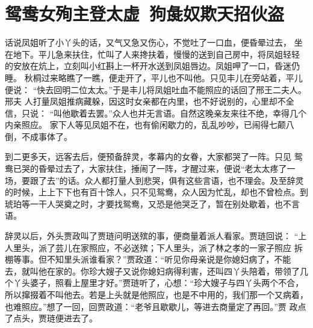 \chapter{鸳鸯女殉主登太虚~狗彘奴欺天招伙盗}

话说凤姐听了小丫头的话，又气又急又伤心，不觉吐了一口血，便昏晕过去，
坐在地下。平儿急来扶住，忙叫了人来搀扶着，慢慢的送到自己房中，将凤姐轻轻
的安放在炕上，立刻叫小红斟上一杯开水送到凤姐唇边。凤姐呷了一口，昏迷仍睡。
秋桐过来略瞧了一瞧，便走开了，平儿也不叫他。只见丰儿在旁站着，平儿便说：
“快去回明二位太太。”于是丰儿将凤姐吐血不能照应的话回了邢王二夫人。邢夫
人打量凤姐推病藏躲，因这时女亲都在内里，也不好说别的，心里却不全信，只说：
“叫他歇着去罢。”众人也并无言语。自然这晚亲友来往不绝，幸得几个内亲照应。
家下人等见凤姐不在，也有偷闲歇力的，乱乱吵吵，已闹得七颠八倒，不成事体了。

到二更多天，远客去后，便预备辞灵，孝幕内的女眷，大家都哭了一阵。只见
鸳鸯已哭的昏晕过去了，大家扶住，捶闹了一阵，才醒过来，便说“老太太疼了一
场，要跟了去”的话。众人都打量人到悲哭，俱有这些言语，也不理会。及至辞灵
的时候，上上下下也有百十馀人，只不见鸳鸯，众人因为忙乱，却也不曾检点。到
琥珀等一干人哭奠之时，才要找鸳鸯，又恐是他哭乏了，暂在别处歇着，也不言语。

辞灵以后，外头贾政叫了贾琏问明送殡的事，便商量着派人看家。贾琏回说：
“上人里头，派了芸儿在家照应，不必送殡；下人里头，派了林之孝的一家子照应
拆棚等事。但不知里头派谁看家？”贾政道：“听见你母亲说是你媳妇病了，不能
去，就叫他在家的。你珍大嫂子又说你媳妇病得利害，还叫四丫头陪着，带领了几
个丫头婆子，照看上屋里才好。”贾琏听了，心想：“珍大嫂子与四丫头两个不合，
所以撺掇着不叫他去。若是上头就是他照应，也是不中用的，我们那一个又病着，
也难照应。”想了一回，回贾政道：“老爷且歇歇儿，等进去商量定了再回。”贾
政点了点头，贾琏便进去了。

